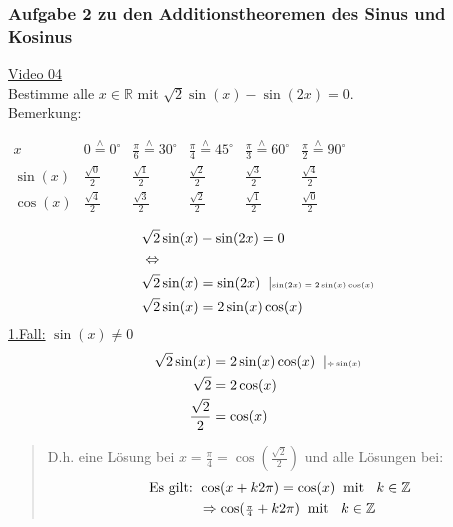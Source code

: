 \subsubsection{ Aufgabe 2 zu den Additionstheoremen des Sinus und Kosinus}
\href{https://youtu.be/Ibl3wG8lgyE}{Video 04}\\
Bestimme alle $ x\in\mathbb{R} $ mit $ \sqrt{2}\sin(x)-\sin(2x)=0 $.\\
Bemerkung:\\
\begin{center}
	\renewcommand{\arraystretch}{1.8}
	\( \begin{array}{l|c|c|c|c|c} 
	x&0\overset{\wedge}{=}0^\circ&\frac{\pi}{6}\overset{\wedge}{=}30^\circ&\frac{\pi}{4}\overset{\wedge}{=}45^\circ&\frac{\pi}{3}\overset{\wedge}{=}60^\circ&\frac{\pi}{2}\overset{\wedge}{=}90^\circ\\
	\hline
	\sin(x)&\frac{\sqrt{0}}{2}&\frac{\sqrt{1}}{2}&\frac{\sqrt{2}}{2}&\frac{\sqrt{3}}{2}&\frac{\sqrt{4}}{2}\\
	\hline
	\cos(x)&\frac{\sqrt{4}}{2}&\frac{\sqrt{3}}{2}&\frac{\sqrt{2}}{2}&\frac{\sqrt{1}}{2}&\frac{\sqrt{0}}{2}
	\end{array} \)	
\end{center}
\begin{align*}
&\sqrt{2}\sin(x)-\sin(2x)=0\\
&\Leftrightarrow\\
&\sqrt{2}\sin(x)=\sin(2x)\;\;|\text{\tiny $ \sin(2x)=2\sin(x)\cos(x) $ }\\
&\sqrt{2}\sin(x)=2\sin(x)\cos(x)\\
\end{align*}
\underline{1.Fall:} $ \sin(x)\neq 0 $\\
\begin{align*}
\sqrt{2}\sin(x)&=2\sin(x)\cos(x)\;\;|\text{\tiny $\div \sin(x)  $  }\\
\sqrt{2}&=2\cos(x)\\
\frac{\sqrt{2}}{2}&=\cos(x)\\
\end{align*}
\begin{quote}
	D.h. eine Lösung bei $ x=\frac{\pi}{4}=\cos(\frac{\sqrt{2}}{2}) $ und alle Lösungen bei:\\
	\begin{align*}
	\text{Es gilt: }&\cos(x+k2\pi)=\cos(x)\;\;\text{mit }\;\; k\in\mathbb{Z}\\
	&\Rightarrow \cos(\genfrac{}{}{}{2}{\pi }{4 }+k2\pi) \;\;\text{mit }\;\;k\in\mathbb{Z}\\
	\end{align*}
\end{quote}
